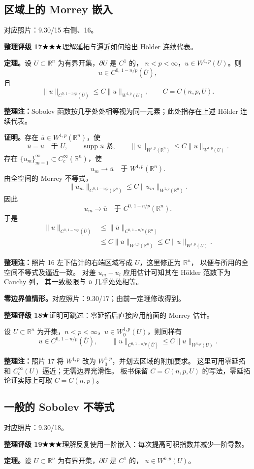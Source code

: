 \documentclass[UTF8,a4paper,11pt,fontset=fandol]{ctexart}
\newcommand{\R}{\mathbb R}
\newcommand{\ednote}[1]{\par{\small\color{notegray}\textbf{整理注：}#1}\par}
\newcommand{\source}[1]{{\small\color{notegray}对应照片：#1。}\par}
\newcommand{\proofstars}[1]{\ensuremath{%
\ifnum#1>0\relax\bigstar\fi
\ifnum#1>1\relax\bigstar\fi
\ifnum#1>2\relax\bigstar\fi
\ifnum#1>3\relax\bigstar\fi
\ifnum#1>4\relax\bigstar\fi}}
\newcommand{\proofrating}[3]{\par{\small\color{proofblue}%
\textbf{整理评级 #1}\enspace\proofstars{#2}\quad #3\par}}
\begin{document}
\newpage
\subsection{区域上的 Morrey 嵌入}
\source{9.30/15 右侧、16}
\proofrating{17}{3}{理解延拓与逼近如何给出 Hölder 连续代表。}
\textbf{定理。}设 $U\subset\R^n$ 为有界开集，$\partial U$ 是 $C^1$ 的，
$n<p<\infty$，$u\in W^{1,p}(U)$。则
\[
u\in C^{0,\,1-n/p}(\overline U),
\]
且
\[
\|u\|_{C^{0,\,1-n/p}(\overline U)}
\leq C\|u\|_{W^{1,p}(U)},\qquad C=C(n,p,U).
\]
\ednote{Sobolev 函数按几乎处处相等视为同一元素；此处指存在上述 Hölder 连续代表。}

\textbf{证明。}存在 $\overline u\in W^{1,p}(\R^n)$，使
\[
\overline u=u\quad\text{于 }U,\qquad
\operatorname{supp}\overline u\text{ 紧},
\qquad
\|\overline u\|_{W^{1,p}(\R^n)}\leq C\|u\|_{W^{1,p}(U)}.
\]
存在 $\{u_m\}_{m=1}^\infty\subset C_c^\infty(\R^n)$，使
\[
u_m\longrightarrow\overline u\quad\text{于 }W^{1,p}(\R^n).
\]
由全空间的 Morrey 不等式，
\[
\|u_m\|_{C^{0,\,1-n/p}(\R^n)}
\leq C\|u_m\|_{W^{1,p}(\R^n)}.
\]
因此
\[
u_m\longrightarrow\overline u\quad\text{于 }C^{0,\,1-n/p}(\R^n).
\]
于是
\[
\begin{aligned}
\|u\|_{C^{0,\,1-n/p}(\overline U)}
&\leq\|\overline u\|_{C^{0,\,1-n/p}(\R^n)}\\
&\leq C\|\overline u\|_{W^{1,p}(\R^n)}
\leq C\|u\|_{W^{1,p}(U)}.
\end{aligned}
\]
\ednote{照片 16 左下估计的右端区域写成 $U$，这里修正为 $\R^n$，
以便与所用的全空间不等式及逼近一致。
对差 $u_m-u_l$ 应用估计可知其在 Hölder 范数下为 Cauchy 列，
其一致极限与 $\overline u$ 几乎处处相等。}

\textbf{零边界值情形。}\source{9.30/17；由前一定理修改得到}
\proofrating{18}{1}{证明可跳过：零延拓后直接应用前面的 Morrey 估计。}
设 $U\subset\R^n$ 为开集，$n<p<\infty$，$u\in W_0^{1,p}(U)$，则同样有
\[
u\in C^{0,\,1-n/p}(\overline U),\qquad
\|u\|_{C^{0,\,1-n/p}(\overline U)}
\leq C\|u\|_{W^{1,p}(U)}.
\]
\ednote{照片 17 将 $W^{1,p}$ 改为 $W_0^{1,p}$，并划去区域的附加要求。
这里可用零延拓和 $C_c^\infty(U)$ 逼近；无需边界光滑性。
板书保留 $C=C(n,p,U)$ 的写法，零延拓论证实际上可取 $C=C(n,p)$。}

\newpage
\subsection{一般的 Sobolev 不等式}
\source{9.30/18}
\proofrating{19}{3}{理解反复使用一阶嵌入：每次提高可积指数并减少一阶导数。}
\textbf{定理。}设 $U\subset\R^n$ 为有界开集，$\partial U$ 是 $C^1$ 的，
$u\in W^{k,p}(U)$。
\end{document}
